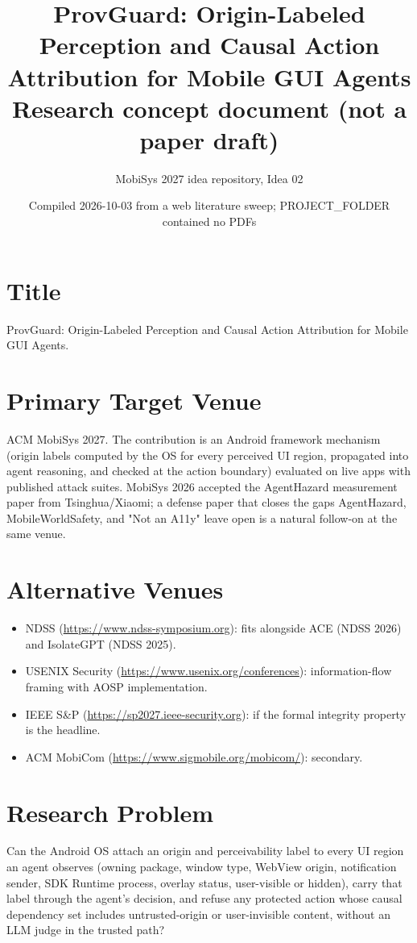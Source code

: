 \documentclass[11pt]{article}
\title{ProvGuard: Origin-Labeled Perception and Causal Action Attribution for Mobile GUI Agents\\
\large Research concept document (not a paper draft)}
\author{MobiSys 2027 idea repository, Idea 02}
\date{Compiled 2026-10-03 from a web literature sweep; PROJECT\_FOLDER contained no PDFs}
\begin{document}
\maketitle

\section{Title}
ProvGuard: Origin-Labeled Perception and Causal Action Attribution for Mobile GUI Agents.

\section{Primary Target Venue}
ACM MobiSys 2027. The contribution is an Android framework mechanism (origin labels computed by the OS for every perceived UI region, propagated into agent reasoning, and checked at the action boundary) evaluated on live apps with published attack suites. MobiSys 2026 accepted the AgentHazard measurement paper from Tsinghua/Xiaomi; a defense paper that closes the gaps AgentHazard, MobileWorldSafety, and "Not an A11y" leave open is a natural follow-on at the same venue.

\section{Alternative Venues}
\begin{itemize}
  \item NDSS (\url{https://www.ndss-symposium.org}): fits alongside ACE (NDSS 2026) and IsolateGPT (NDSS 2025).
  \item USENIX Security (\url{https://www.usenix.org/conferences}): information-flow framing with AOSP implementation.
  \item IEEE S\&P (\url{https://sp2027.ieee-security.org}): if the formal integrity property is the headline.
  \item ACM MobiCom (\url{https://www.sigmobile.org/mobicom/}): secondary.
\end{itemize}

\section{Research Problem}
Can the Android OS attach an origin and perceivability label to every UI region an agent observes (owning package, window type, WebView origin, notification sender, SDK Runtime process, overlay status, user-visible or hidden), carry that label through the agent's decision, and refuse any protected action whose causal dependency set includes untrusted-origin or user-invisible content, without an LLM judge in the trusted path?
\end{document}
